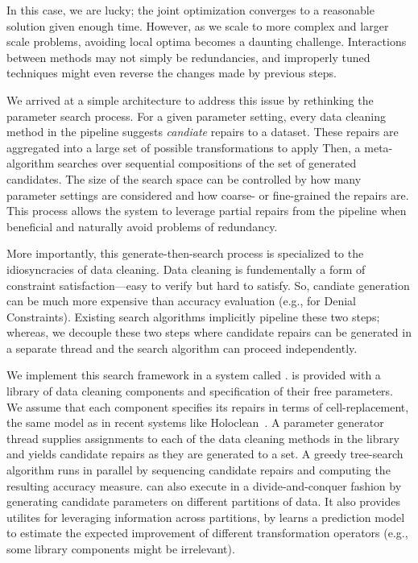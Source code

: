 In this case, we are lucky; the joint optimization converges to a reasonable solution given enough time.
However, as we scale to more complex and larger scale problems, avoiding local optima becomes a daunting challenge.
Interactions between methods may not simply be redundancies, and improperly tuned techniques might even reverse the changes made by previous steps.

We arrived at a simple architecture to address this issue by rethinking the parameter search process.
For a given parameter setting, every data cleaning method in the pipeline suggests \emph{candiate} repairs to a dataset.
These repairs are aggregated into a large set of possible transformations to apply
Then, a meta-algorithm searches over sequential compositions of the set of generated candidates.
The size of the search space can be controlled by how many parameter settings are considered and how coarse- or fine-grained the repairs are.
This process allows the system to leverage partial repairs from the pipeline when beneficial and naturally avoid problems of redundancy.

More importantly, this generate-then-search process is specialized to the idiosyncracies of data cleaning.
Data cleaning is fundementally a form of constraint satisfaction---easy to verify but hard to satisfy.
So, candiate generation can be much more expensive than accuracy evaluation (e.g., for Denial Constraints).
Existing search algorithms implicitly pipeline these two steps; whereas, we decouple these two steps where candidate repairs can be generated in a separate thread and the search algorithm can proceed independently.

We implement this search framework in a system called \sys.
\sys is provided with a library of data cleaning components and specification of their free parameters. 
We assume that each component specifies its repairs in terms of cell-replacement, the same model as in recent systems like Holoclean~\cite{rekatsinas2017holoclean}.
A parameter generator thread supplies assignments to each of the data cleaning methods in the library and yields candidate repairs as they are generated to a set.
A greedy tree-search algorithm runs in parallel by sequencing candidate repairs and computing the resulting accuracy measure.
\sys can also execute in a divide-and-conquer fashion by generating candidate parameters on different partitions of data.
It also provides utilites for leveraging information across partitions, by learns a prediction model to estimate the expected improvement of different transformation operators (e.g., some library components might be irrelevant).  

